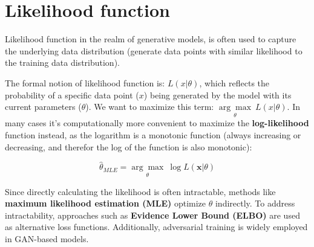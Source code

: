 \section{Likelihood function}
\label{appendix:likelihood_function}

Likelihood function in the realm of generative models, is often used to capture the underlying data distribution (generate data points with similar likelihood to the training data distribution).

The formal notion of likelihood function is: $L(x | \theta)$, which reflects the probability of a specific data point ($x$) being generated by the model with its current parameters ($\theta$). We want to maximize this term: $\underset{\theta}{\arg\max}\ L(x | \theta)$. In many cases it's computationally more convenient to maximize the \textbf{log-likelihood} function instead, as the logarithm is a monotonic function (always increasing or decreasing, and therefor the log of the function is also monotonic):

\[
    \hat{\theta}_{MLE} = \underset{\theta}{\arg\max} \ \log L(\mathbf{x} | \theta)
\]

Since directly calculating the likelihood is often intractable, methods like \textbf{maximum likelihood estimation (MLE)} optimize $\theta$ indirectly. To address intractability, approaches such as \textbf{Evidence Lower Bound (ELBO)} are used as alternative loss functions. Additionally, adversarial training is widely employed in GAN-based models.
